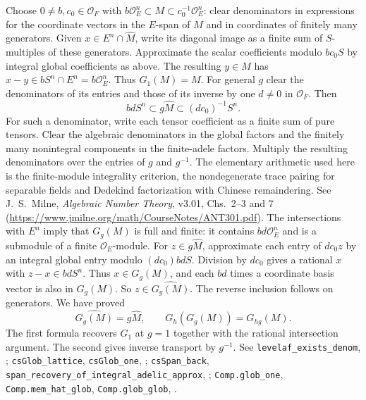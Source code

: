 Choose $0\ne b,c_0\in\mathcal O_F$ with
$b\mathcal O_E^n\subset M\subset c_0^{-1}\mathcal O_E^n$:
clear denominators in expressions for the coordinate vectors in the
$E$-span of $M$ and in coordinates of finitely many generators.
Given $x\in E^n\cap\widehat M$, write its diagonal image as a finite
sum of $S$-multiples of these generators. Approximate the scalar
coefficients modulo $bc_0 S$ by integral global coefficients as above.
The resulting $y\in M$ has $x-y\in bS^n\cap E^n=b\mathcal O_E^n$.
Thus $G_1(M)=M$. For general $g$ clear the denominators of its entries
and those of its inverse by one $d\ne0$ in $\mathcal O_F$. Then
\[
 bd S^n\subset g\widehat M\subset (dc_0)^{-1}S^n .
\]
For such a denominator, write each tensor coefficient as a finite sum
of pure tensors. Clear the algebraic denominators in the global factors
and the finitely many nonintegral components in the finite-adele factors.
Multiply the resulting denominators over the entries of $g$ and $g^{-1}$.
The elementary arithmetic used here is the finite-module integrality
criterion, the nondegenerate trace pairing for separable fields and
Dedekind factorization with Chinese remaindering. See J.~S.~Milne,
\emph{Algebraic Number Theory}, v3.01, Chs.~2--3 and 7
(\url{https://www.jmilne.org/math/CourseNotes/ANT301.pdf}).
The intersections with $E^n$ imply that $G_g(M)$ is full and finite:
it contains $bd\mathcal O_E^n$ and is a submodule of a finite
$\mathcal O_E$-module. For $z\in g\widehat M$, approximate each entry
of $dc_0 z$ by an integral global entry modulo $(dc_0)bd S$.
Division by $dc_0$ gives a rational $x$ with $z-x\in bd S^n$.
Thus $x\in G_g(M)$, and each $bd$ times a coordinate basis vector is also
in $G_g(M)$. So $z\in\widehat{G_g(M)}$. The reverse inclusion follows
on generators. We have proved
\[
 \widehat{G_g(M)}=g\widehat M,\qquad G_h(G_g(M))=G_{hg}(M).
\]
The first formula recovers $G_1$ at $g=1$ together with the rational
intersection argument. The second gives inverse transport by $g^{-1}$.
See \nolinkurl{levelaf_exists_denom}, ;
\nolinkurl{csGlob_lattice}, \nolinkurl{csGlob_one},
;
\nolinkurl{csSpan_back}, \nolinkurl{span_recovery_of_integral_adelic_approx},
;
\nolinkurl{Comp.glob_one}, \nolinkurl{Comp.mem_hat_glob}, \nolinkurl{Comp.glob_glob},
.


